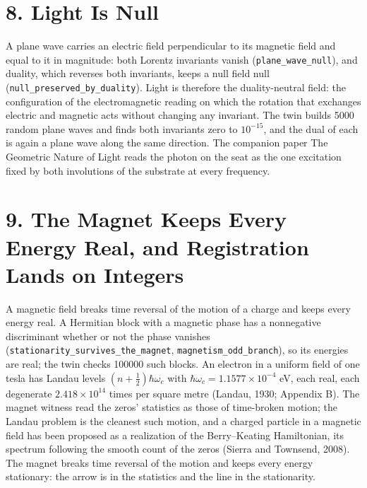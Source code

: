 \documentclass[10pt]{article}
\begin{document}
\hypertarget{light-is-null}{%
\section{8. Light Is Null}\label{light-is-null}}

A plane wave carries an electric field perpendicular to its magnetic
field and equal to it in magnitude: both Lorentz invariants vanish
(\texttt{plane\_wave\_null}), and duality, which reverses both
invariants, keeps a null field null
(\texttt{null\_preserved\_by\_duality}). Light is therefore the
duality-neutral field: the configuration of the electromagnetic reading
on which the rotation that exchanges electric and magnetic acts without
changing any invariant. The twin builds 5000 random plane waves and
finds both invariants zero to \(10^{-15}\), and the dual of each is
again a plane wave along the same direction. The companion paper The
Geometric Nature of Light reads the photon on the seat as the one
excitation fixed by both involutions of the substrate at every
frequency.

\hypertarget{the-magnet-keeps-every-energy-real-and-registration-lands-on-integers}{%
\section{9. The Magnet Keeps Every Energy Real, and Registration Lands
on
Integers}\label{the-magnet-keeps-every-energy-real-and-registration-lands-on-integers}}

A magnetic field breaks time reversal of the motion of a charge and
keeps every energy real. A Hermitian block with a magnetic phase has a
nonnegative discriminant whether or not the phase vanishes
(\texttt{stationarity\_survives\_the\_magnet},
\texttt{magnetism\_odd\_branch}), so its energies are real; the twin
checks 100000 such blocks. An electron in a uniform field of one tesla
has Landau levels \((n+\tfrac12)\hbar\omega_c\) with
\(\hbar\omega_c=1.1577\times10^{-4}\) eV, each real, each degenerate
\(2.418\times10^{14}\) times per square metre (Landau, 1930; Appendix
B). The magnet witness read the zeros' statistics as those of
time-broken motion; the Landau problem is the cleanest such motion, and
a charged particle in a magnetic field has been proposed as a
realization of the Berry--Keating Hamiltonian, its spectrum following
the smooth count of the zeros (Sierra and Townsend, 2008). The magnet
breaks time reversal of the motion and keeps every energy stationary:
the arrow is in the statistics and the line in the stationarity.
\end{document}
